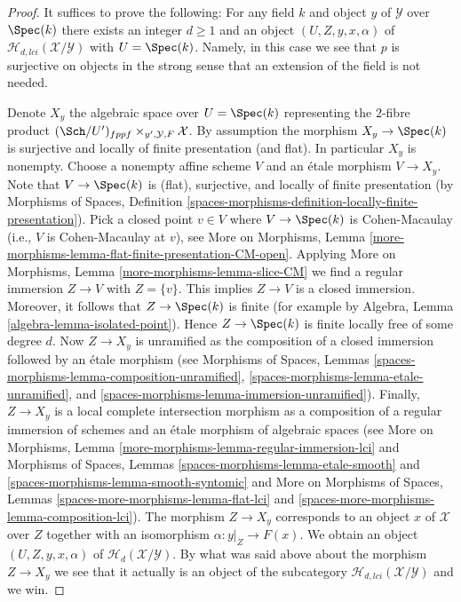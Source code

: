 \begin{proof}
It suffices to prove the following: For any field $k$
and object $y$ of $\mathcal{Y}$ over $\Spec(k)$ there exists
an integer $d \geq 1$ and an object $(U, Z, y, x, \alpha)$ of
$\mathcal{H}_{d, lci}(\mathcal{X}/\mathcal{Y})$ with $U = \Spec(k)$.
Namely, in this case we see that $p$ is surjective on objects in the
strong sense that an extension of the field is not needed.

\medskip\noindent
Denote $X_y$ the algebraic space over $U = \Spec(k)$
representing the $2$-fibre product
$(\Sch/U')_{fppf} \times_{y', \mathcal{Y}, F} \mathcal{X}$.
By assumption the morphism $X_y \to \Spec(k)$ is surjective and
locally of finite presentation (and flat). In particular $X_y$ is
nonempty. Choose a nonempty affine scheme $V$ and an \'etale morphism
$V \to X_y$. Note that $V \to \Spec(k)$ is (flat), surjective,
and locally of finite presentation (by
Morphisms of Spaces,
Definition \ref{spaces-morphisms-definition-locally-finite-presentation}).
Pick a closed point $v \in V$ where $V \to \Spec(k)$ is Cohen-Macaulay
(i.e., $V$ is Cohen-Macaulay at $v$), see
More on Morphisms,
Lemma \ref{more-morphisms-lemma-flat-finite-presentation-CM-open}.
Applying
More on Morphisms,
Lemma \ref{more-morphisms-lemma-slice-CM}
we find a regular immersion $Z \to V$ with $Z = \{v\}$.
This implies $Z \to V$ is a closed immersion. Moreover, it follows that
$Z \to \Spec(k)$ is finite (for example by
Algebra, Lemma \ref{algebra-lemma-isolated-point}).
Hence $Z \to \Spec(k)$ is finite locally free of some degree $d$.
Now $Z \to X_y$ is unramified as the composition
of a closed immersion followed by an \'etale morphism
(see
Morphisms of Spaces, Lemmas \ref{spaces-morphisms-lemma-composition-unramified},
\ref{spaces-morphisms-lemma-etale-unramified}, and
\ref{spaces-morphisms-lemma-immersion-unramified}).
Finally, $Z \to X_y$ is a local complete intersection morphism
as a composition of a regular immersion of schemes and an \'etale
morphism of algebraic spaces (see
More on Morphisms, Lemma \ref{more-morphisms-lemma-regular-immersion-lci}
and
Morphisms of Spaces, Lemmas \ref{spaces-morphisms-lemma-etale-smooth} and
\ref{spaces-morphisms-lemma-smooth-syntomic} and
More on Morphisms of Spaces,
Lemmas \ref{spaces-more-morphisms-lemma-flat-lci} and
\ref{spaces-more-morphisms-lemma-composition-lci}).
The morphism $Z \to X_y$ corresponds to an object $x$ of $\mathcal{X}$
over $Z$ together with an isomorphism $\alpha : y|_Z \to F(x)$.
We obtain an object $(U, Z, y, x, \alpha)$ of
$\mathcal{H}_d(\mathcal{X}/\mathcal{Y})$. By what was said above about
the morphism $Z \to X_y$ we see that it actually is an object of the
subcategory $\mathcal{H}_{d, lci}(\mathcal{X}/\mathcal{Y})$ and we win.
\end{proof}




















